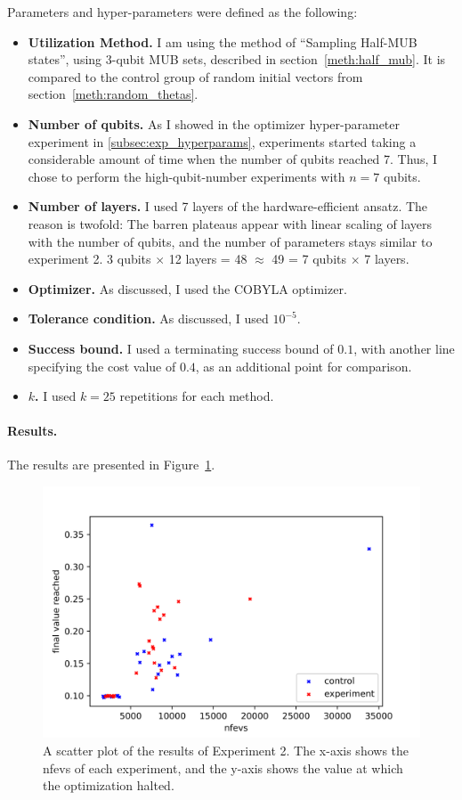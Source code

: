 \documentclass[a4paper,12pt]{article}
\newcommand{\e}[1]{ 10^{#1}}
\newenvironment{denseitemize}%
  {\begin{itemize}%
    \setlength{\itemsep}{0pt}}%
  {\end{itemize}}
\begin{document}
Parameters and hyper-parameters were defined as the following:
\begin{denseitemize}
    \item \textbf{Utilization Method.} I am using the method of ``Sampling Half-MUB states'', using 3-qubit MUB sets, described in section~\ref{meth:half_mub}. It is compared to the control group of random initial vectors from section~\ref{meth:random_thetas}.
    \item \textbf{Number of qubits.} As I showed in the optimizer hyper-parameter experiment in \ref{subsec:exp_hyperparams}, experiments started taking a considerable amount of time when the number of qubits reached 7.
    Thus, I chose to perform the high-qubit-number experiments with $n=7$ qubits.
    \item \textbf{Number of layers.} I used 7 layers of the hardware-efficient ansatz. The reason is twofold: The barren plateaus appear with linear scaling of layers with the number of qubits, and the number of parameters stays similar to experiment 2.
    3 qubits $\times$ 12 layers = 48 $\approx$ 49 = 7 qubits $\times$ 7 layers.
    \item \textbf{Optimizer.} As discussed, I used the COBYLA optimizer.
    \item \textbf{Tolerance condition.} As discussed, I used $\e{-5}$.
    \item \textbf{Success bound.} I used a terminating success bound of $0.1$, with another line specifying the cost value of $0.4$, as an additional point for comparison.
    \item \textbf{$k$.} I used $k=25$ repetitions for each method.
\end{denseitemize}

\paragraph*{Results.}
The results are presented in Figure~\ref{fig:7qubits}.

\begin{figure}[]
    \centering
    \captionsetup{justification=centering, margin=0.5cm}
    \includegraphics[scale=0.8]{7qubits.png}
    \caption{A scatter plot of the results of Experiment 2. The x-axis shows the nfevs of each experiment, and the y-axis shows the value at which the optimization halted.}
    \label{fig:7qubits}
\end{figure}
\end{document}
